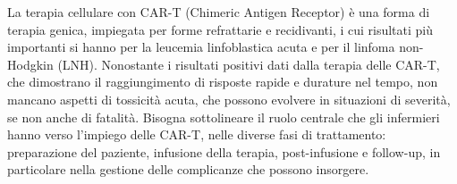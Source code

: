 La terapia cellulare con CAR-T (Chimeric Antigen Receptor) è una forma di terapia genica, impiegata
per forme refrattarie e recidivanti, i cui risultati più importanti si hanno per la leucemia linfoblastica
acuta e per il linfoma non-Hodgkin (LNH).
Nonostante i risultati positivi dati dalla terapia delle CAR-T, che dimostrano il raggiungimento di
risposte rapide e durature nel tempo, non mancano aspetti di tossicità acuta, che possono evolvere
in situazioni di severità, se non anche di fatalità. Bisogna sottolineare il ruolo centrale che gli infermieri hanno 
verso l’impiego delle CAR-T, nelle diverse fasi di trattamento: preparazione del paziente, infusione della terapia, 
post-infusione e follow-up, in particolare nella gestione delle complicanze che possono insorgere. 


